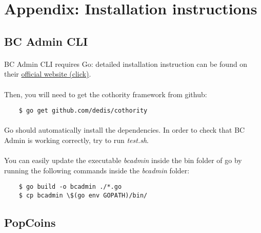 \section{Appendix: Installation instructions}

\subsection{BC Admin CLI}

\paragraph{}

BC Admin CLI requires Go: detailed installation instruction can be found on their \href{https://golang.org/doc/install}{official website (click)}.

\paragraph{}

Then, you will need to get the cothority framework from github:

\begin{lstlisting}
    $ go get github.com/dedis/cothority
\end{lstlisting}

\paragraph{}

Go should automatically install the dependencies. In order to check that BC Admin is working correctly, try to run \textit{test.sh}.

\paragraph{}

You can easily update the executable \textit{bcadmin} inside the bin folder of go by running the following commands inside the \textit{bcadmin} folder:

\begin{lstlisting}
    $ go build -o bcadmin ./*.go
    $ cp bcadmin \$(go env GOPATH)/bin/
\end{lstlisting}

\subsection{PopCoins}

